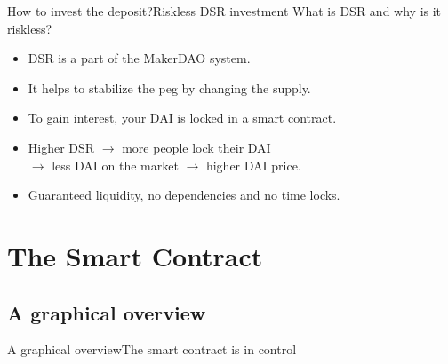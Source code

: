 \documentclass{beamer}
\begin{document}
\begin{frame}{How to invest the deposit?}{Riskless DSR investment}
	What is DSR and why is it riskless? \pause
	\begin{itemize}
		\item<2-> DSR is a part of the MakerDAO system.
		\item<2-> It helps to stabilize the peg by changing the supply.
	\end{itemize}
	\vspace{1em}
	\begin{itemize}
		\item<3-> To gain interest, your DAI is locked in a smart contract.
		\item<4-> Higher DSR $\rightarrow$ more people lock their DAI \\
		$\rightarrow$ less DAI on the market $\rightarrow$ higher DAI price.
		\item<5-> Guaranteed liquidity, no dependencies and no time locks.
	\end{itemize}
\end{frame}


\section{The Smart Contract}
  \label{sec:contract}


\subsection{A graphical overview}

\begin{frame}{A graphical overview}{The smart contract is in control}
	\begin{figure}[h]
		\label{fig:contractBase}
	\end{figure}
\end{frame}
\end{document}
